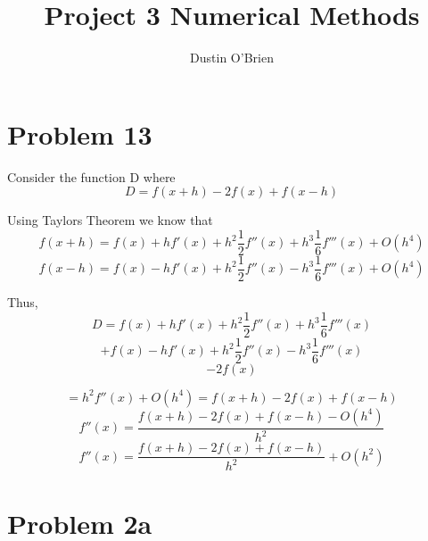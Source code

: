 \documentclass[]{article}
\title{Project 3 Numerical Methods}
\author{Dustin O'Brien}
\begin{document}
	
	\maketitle
	
	\section*{Problem 13}
	Consider the function D where
	\[D=f(x+h) - 2 f(x) + f(x-h)\]
	
	Using Taylors Theorem we know that
	\[f(x + h) = f(x) + hf'(x) + h^2 \frac{1}{2}f''(x) + h^3 \frac{1}{6}f'''(x) + O(h^4)\] 
	\[f(x - h) = f(x) - hf'(x) + h^2 \frac{1}{2}f''(x) - h^3 \frac{1}{6}f'''(x) + O(h^4)\]
	
	Thus,
	\[D = f(x) + hf'(x) + h^2 \frac{1}{2}f''(x) + h^3 \frac{1}{6}f'''(x)\]
	\[+ f(x) - hf'(x) + h^2 \frac{1}{2}f''(x) - h^3 \frac{1}{6}f'''(x)\]
	\[-2f(x)\]
	
	\[= h^2f''(x) + O(h^4) = f(x+h) - 2 f(x) + f(x-h)\]
	\[f''(x) = \frac{f(x+h) - 2 f(x) + f(x-h) - O(h^4)}{h^2}\]
	\[f''(x) = \frac{f(x+h) - 2 f(x) + f(x-h)}{h^2} + O(h^2)\]
	
	\section*{Problem 2a}
	
	\[\]
	
\end{document}
